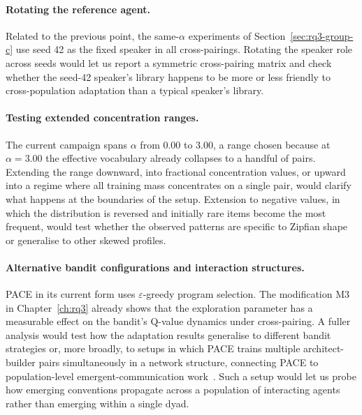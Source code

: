 \paragraph{Rotating the reference agent.}
Related to the previous point, the same-$\alpha$ experiments of Section~\ref{sec:rq3-group-c} use seed 42 as the fixed speaker in all cross-pairings. Rotating the speaker role across seeds would let us report a symmetric cross-pairing matrix and check whether the seed-42 speaker's library happens to be more or less friendly to cross-population adaptation than a typical speaker's library.

\paragraph{Testing extended concentration ranges.}
The current campaign spans $\alpha$ from 0.00 to 3.00, a range chosen because at $\alpha = 3.00$ the effective vocabulary already collapses to a handful of pairs. Extending the range downward, into fractional concentration values, or upward into a regime where all training mass concentrates on a single pair, would clarify what happens at the boundaries of the setup. Extension to negative values, in which the distribution is reversed and initially rare items become the most frequent, would test whether the observed patterns are specific to Zipfian shape or generalise to other skewed profiles.

\paragraph{Alternative bandit configurations and interaction structures.}
PACE in its current form uses $\varepsilon$-greedy program selection. The modification M3 in Chapter~\ref{ch:rq3} already shows that the exploration parameter has a measurable effect on the bandit's Q-value dynamics under cross-pairing. A fuller analysis would test how the adaptation results generalise to different bandit strategies or, more broadly, to setups in which PACE trains multiple architect-builder pairs simultaneously in a network structure, connecting PACE to population-level emergent-communication work~\cite{kim2021emergent,rita_role_2022}. Such a setup would let us probe how emerging conventions propagate across a population of interacting agents rather than emerging within a single dyad.

